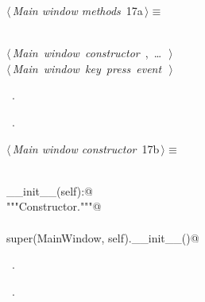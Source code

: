 \documentclass[
    a4paper,      %
    10pt,         %
    openright,    %
    notitlepage,  %
    parskip=half, %
]{scrreprt}       %
\theoremstyle{definition}                    %
\begin{document}
\begin{flushleft} \small
\begin{minipage}{\linewidth}\label{scrap8}\raggedright\small
{} $\langle\,${\itshape Main window methods}\nobreak\ {\footnotesize {17a}}$\,\rangle\equiv$
\vspace{-1ex}
\begin{list}{}{} \item
\mbox{}\lstinline@@\\
\mbox{}\lstinline@@\hbox{$\langle\,${\itshape Main window constructor}\nobreak\ {\footnotesize {}, \ldots\ }$\,\rangle$}\lstinline@@\\
\mbox{}\lstinline@@\hbox{$\langle\,${\itshape Main window key press event}\nobreak\ {\footnotesize {}}$\,\rangle$}\lstinline@@\\
\mbox{}\lstinline@@{\NWsep}
\end{list}
\vspace{-1.5ex}
\footnotesize
\begin{list}{}{\setlength{\itemsep}{-\parsep}\setlength{\itemindent}{-\leftmargin}}
\item \NWtxtMacroDefBy\ .
\item \NWtxtMacroRefIn\ .

\item{}
\end{list}
\end{minipage}\vspace{4ex}
\end{flushleft}
\begin{flushleft} \small
\begin{minipage}{\linewidth}\label{scrap9}\raggedright\small
{} $\langle\,${\itshape Main window constructor}\nobreak\ {\footnotesize {17b}}$\,\rangle\equiv$
\vspace{-1ex}
\begin{list}{}{} \item
\mbox{}\lstinline@@\\
\mbox{}\lstinline@def __init__(self):@\\
\mbox{}\lstinline@    """Constructor."""@\\
\mbox{}\lstinline@@\\
\mbox{}\lstinline@    super(MainWindow, self).__init__()@\\
\mbox{}\lstinline@@{\NWsep}
\end{list}
\vspace{-1.5ex}
\footnotesize
\begin{list}{}{\setlength{\itemsep}{-\parsep}\setlength{\itemindent}{-\leftmargin}}
\item \NWtxtMacroDefBy\ .
\item \NWtxtMacroRefIn\ .

\item{}
\end{list}
\end{minipage}\vspace{4ex}
\end{flushleft}
\end{document}

